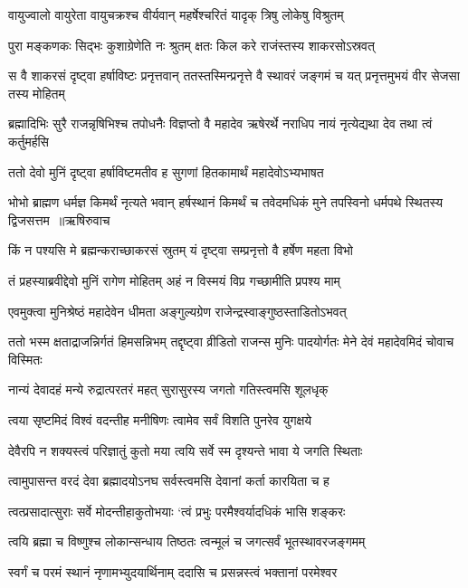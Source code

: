 \twolineshloka
{वायुज्वालो वायुरेता वायुचक्रश्च वीर्यवान्}
{महर्षेश्चरितं यादृक् त्रिषु लोकेषु विश्रुतम्}


\twolineshloka
{पुरा मङ्कणकः सिद्भः कुशाग्रेणेति नः श्रुतम्}
{क्षतः किल करे राजंस्तस्य शाकरसोऽस्रवत्}


स वै शाकरसं दृष्ट्वा हर्षाविष्टः प्रनृत्तवान्
\twolineshloka
{ततस्तस्मिन्प्रनृत्ते वै स्थावरं जङ्गमं च यत्}
{प्रनृत्तमुभयं वीर सेजसा तस्य मोहितम्}


\threelineshloka
{ब्रह्मादिभिः सुरै राजन्नृषिभिश्च तपोधनैः}
{विज्ञप्तो वै महादेव ऋषेरर्थे नराधिप}
{नायं नृत्येद्यथा देव तथा त्वं कर्तुमर्हसि}


\twolineshloka
{ततो देवो मुनिं दृष्ट्वा हर्षाविष्टमतीव ह}
{सुगणां हितकामार्थं महादेवोऽभ्यभाषत}


\fourlineindentedshloka
{भोभो ब्राह्मण धर्मज्ञ किमर्थं नृत्यते भवान्}
{हर्षस्थानं किमर्थं च तवेदमधिकं मुने}
{तपस्विनो धर्मपथे स्थितस्य द्विजसत्तम ॥ऋषिरुवाच}
{}


\twolineshloka
{किं न पश्यसि मे ब्रह्मन्कराच्छाकरसं स्रुतम्}
{यं दृष्ट्वा सम्प्रनृत्तो वै हर्षेण महता विभो}


\twolineshloka
{तं प्रहस्याब्रवीद्देवो मुनिं रागेण मोहितम्}
{अहं न विस्मयं विप्र गच्छामीति प्रपश्य माम्}


\twolineshloka
{एवमुक्त्वा मुनिश्रेष्ठं महादेवेन धीमता}
{अङ्गुल्यग्रेण राजेन्द्रस्वाङ्गुष्ठस्ताडितोऽभवत्}


ततो भस्म क्षताद्राजन्निर्गतं हिमसन्निभम्
\twolineshloka
{तद्दृष्ट्वा व्रीडितो राजन्स मुनिः पादयोर्गतः}
{मेने देवं महादेवमिदं चोवाच विस्मितः}


\twolineshloka
{नान्यं देवादहं मन्ये रुद्रात्परतरं महत्}
{सुरासुरस्य जगतो गतिस्त्वमसि शूलधृक्}


\twolineshloka
{त्वया सृष्टमिदं विश्वं वदन्तीह मनीषिणः}
{त्वामेव सर्वं विशति पुनरेव युगक्षये}


\twolineshloka
{देवैरपि न शक्यस्त्वं परिज्ञातुं कुतो मया}
{त्वयि सर्वे स्म दृश्यन्ते भावा ये जगति स्थिताः}


\twolineshloka
{त्वामुपासन्त वरदं देवा ब्रह्मादयोऽनघ}
{सर्वस्त्वमसि देवानां कर्ता कारयिता च ह}


\twolineshloka
{त्वत्प्रसादात्सुराः सर्वे मोदन्तीहाकुतोभयाः}
{`त्वं प्रभुः परमैश्वर्यादधिकं भासि शङ्करः}


\twolineshloka
{त्वयि ब्रह्मा च विष्णुश्च लोकान्सन्धाय तिष्ठतः}
{त्वन्मूलं च जगत्सर्वं भूतस्थावरजङ्गमम्}


\twolineshloka
{स्वर्गं च परमं स्थानं नृणामभ्युदयार्थिनाम्}
{ददासि च प्रसन्नस्त्वं भक्तानां परमेश्वर}



